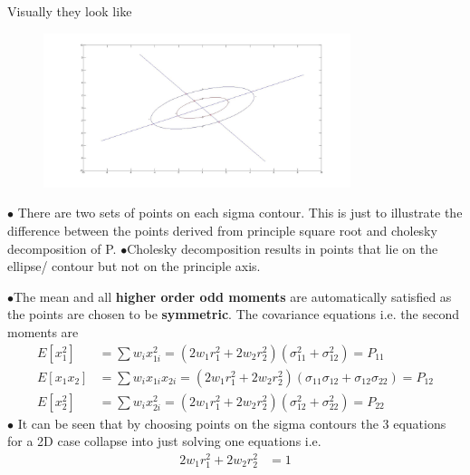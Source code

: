 \documentclass[landscape]{slides}
\begin{document}
\begin{slide}
 Visually they look like \newline
\begin{figure}
	\centering
		\includegraphics[width=0.8\textwidth]{4np1pts.jpg}
	\label{fig:4np1pts}
\end{figure}\newline
 $\bullet$ There are two sets of points on each sigma contour. This is just to illustrate the difference between the points derived from principle square root and cholesky decomposition of P. \newline
 $\bullet$Cholesky decomposition results in points that lie on the ellipse/ contour but not on the principle axis.
    	\end{slide}
\begin{slide}
 $\bullet$The mean and all {\bf higher order odd moments} are automatically satisfied as the points are chosen to be {\bf symmetric}.\newline 
 The covariance equations i.e. the second moments are
\begin{align*} 
E[x_1^2]&=\sum{w_ix_{1i}^2}=(2w_1r_1^2+2w_2r_2^2)(\sigma_{11}^2+\sigma_{12}^2)=P_{11}\\ E[x_1x_2]&=\sum{w_ix_{1i}x_{2i}}=(2w_1r_1^2+2w_2r_2^2)(\sigma_{11}\sigma_{12}+\sigma_{12}\sigma_{22})=P_{12}\\
E[x_2^2]&=\sum{w_ix_{2i}^2}=(2w_1r_1^2+2w_2r_2^2)(\sigma_{12}^2+\sigma_{22}^2)=P_{22}
 \end{align*} 
 $\bullet$ It can be seen that by choosing points on the sigma contours the 3 equations for a 2D case collapse into just solving one equations i.e.
 \begin{align*}
 2w_1r_1^2+2w_2r_2^2&=1
 \end{align*}
    	\end{slide}
\end{document}
